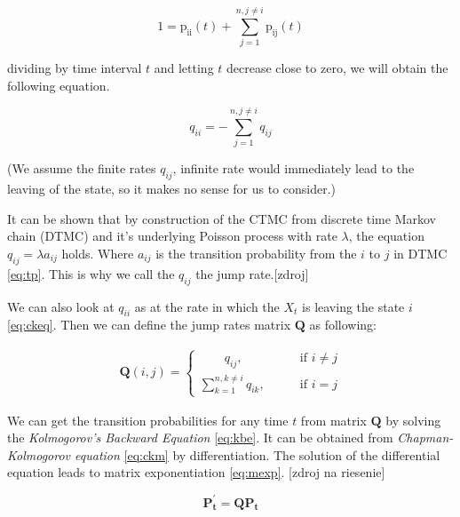 \documentclass[thesis=M,english]{FITthesis}[2012/10/20]
\newcommand{\matr}[1]{\mathbf{#1}}
\begin{document}
\begin{equation}
1 = \mathrm{p_{ii}}(t) + \sum_{j = 1}^{ n ,j \neq i} \mathrm{p_{ij}}(t) 
\end{equation}

dividing by time interval $t$ and letting $t$ decrease close to zero, we will obtain the following equation. 

\begin{equation}\label{eq:qii}
 q_{ii} =  - \sum_{j = 1}^{ n ,j \neq i} q_{ij} 
\end{equation}

(We assume the finite rates $q_{ij}$, infinite rate would immediately lead to the leaving of the state, so it makes no sense for us to consider.)

It can be shown that by construction of the CTMC from discrete time Markov chain (DTMC) and  it's underlying Poisson process with rate $\lambda$, the equation $q_{ij} = \lambda a_{ij}$ holds. Where $a_{ij}$ is the transition probability from the $i$ to $j$ in DTMC \ref{eq:tp}. This is why we call the $q_{ij}$ the jump rate.[zdroj]  


We can also look at $q_{ii}$ as at the rate in which the $X_t$ is leaving the state $i$ \eqref{eq:ckeq}. Then we can define the jump rates matrix $\matr{Q}$ as following:

\begin{equation}
\begin{aligned}  
\matr{Q}(i,j)= 
\begin{cases}
\qquad q_{ij}, \qquad & \text{if } i\neq j\\
\sum\limits_{k = 1}^{ n ,k \neq i} q_{ik}, \qquad & \text{if } i=j
\end{cases}
\end{aligned}
\end{equation}

We can get the transition probabilities for any time $t$ from matrix $\matr{Q}$ by solving the \textit{Kolmogorov's Backward Equation} \eqref{eq:kbe}. It can be obtained from \textit{Chapman-Kolmogorov equation} \eqref{eq:ckm} by differentiation. The solution of the differential equation leads to matrix exponentiation \eqref{eq:mexp}. [zdroj na riesenie]  

\begin{equation}\label{eq:kbe}
\matr{P_t^{'}} = \matr{Q} \matr{P_{t}}
\end{equation}
\end{document}
